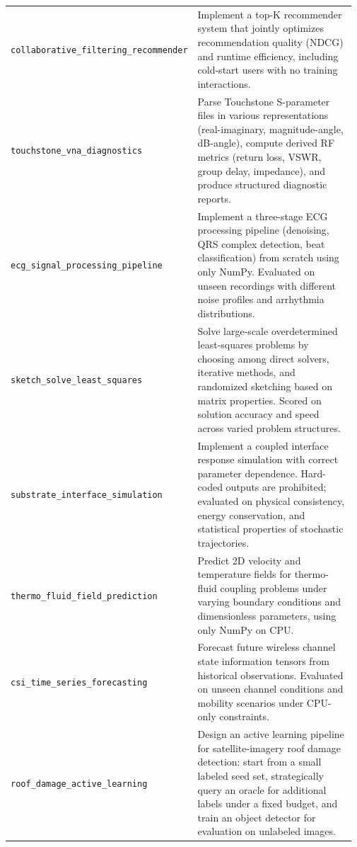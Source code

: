 \begin{longtable}{@{}>{\raggedright\arraybackslash}p{0.20\linewidth}>{\raggedright\arraybackslash}p{0.77\linewidth}@{}}
\tasknoterule
\texttt{collaborative\_\allowbreak{}filtering\_\allowbreak{}recommender} & Implement a top-K recommender system that jointly optimizes recommendation quality (NDCG) and runtime efficiency, including cold-start users with no training interactions. \\
\tasknoterule
\texttt{touchstone\_\allowbreak{}vna\_\allowbreak{}diagnostics} & Parse Touchstone S-parameter files in various representations (real-imaginary, magnitude-angle, dB-angle), compute derived RF metrics (return loss, VSWR, group delay, impedance), and produce structured diagnostic reports. \\
\tasknoterule
\texttt{ecg\_\allowbreak{}signal\_\allowbreak{}processing\_\allowbreak{}pipeline} & Implement a three-stage ECG processing pipeline (denoising, QRS complex detection, beat classification) from scratch using only NumPy. Evaluated on unseen recordings with different noise profiles and arrhythmia distributions. \\
\tasknoterule
\texttt{sketch\_\allowbreak{}solve\_\allowbreak{}least\_\allowbreak{}squares} & Solve large-scale overdetermined least-squares problems by choosing among direct solvers, iterative methods, and randomized sketching based on matrix properties. Scored on solution accuracy and speed across varied problem structures. \\
\tasknoterule
\texttt{substrate\_\allowbreak{}interface\_\allowbreak{}simulation} & Implement a coupled interface response simulation with correct parameter dependence. Hard-coded outputs are prohibited; evaluated on physical consistency, energy conservation, and statistical properties of stochastic trajectories. \\
\tasknoterule
\texttt{thermo\_\allowbreak{}fluid\_\allowbreak{}field\_\allowbreak{}prediction} & Predict 2D velocity and temperature fields for thermo-fluid coupling problems under varying boundary conditions and dimensionless parameters, using only NumPy on CPU. \\
\tasknoterule
\texttt{csi\_\allowbreak{}time\_\allowbreak{}series\_\allowbreak{}forecasting} & Forecast future wireless channel state information tensors from historical observations. Evaluated on unseen channel conditions and mobility scenarios under CPU-only constraints. \\
\tasknoterule
\texttt{roof\_\allowbreak{}damage\_\allowbreak{}active\_\allowbreak{}learning} & Design an active learning pipeline for satellite-imagery roof damage detection: start from a small labeled seed set, strategically query an oracle for additional labels under a fixed budget, and train an object detector for evaluation on unlabeled images. \\

\end{longtable}
